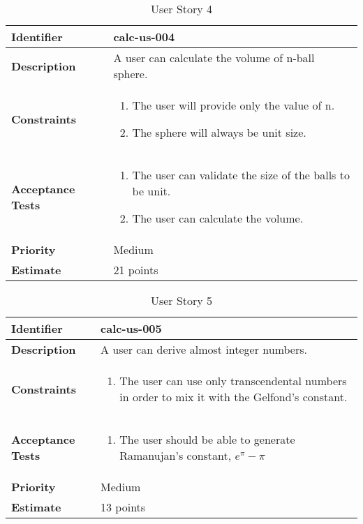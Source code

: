 \documentclass{article}
\begin{document}
\begin{table}[h]
\centering
\begin{tabular}{|p{2.2cm}|p{12cm}|}
\hline
\textbf{Identifier} & {calc-us-004} \\
\hline
\textbf{Description} & {A user can calculate the volume of n-ball sphere.}\\
\hline
\textbf{Constraints} & 
\begin{enumerate}
    \item The user will provide only the value of n.
    \item The sphere will always be unit size. 
\end{enumerate}\\
\hline
\textbf{Acceptance Tests} & 
\begin{enumerate}
    \item The user can validate the size of the balls to be unit.
    \item The user can calculate the volume.
\end{enumerate}\\
\hline
\textbf{Priority} & {Medium}\\
\hline
\textbf{Estimate} & {21 points}\\
\hline
\end{tabular}
\caption{User Story 4}
\end{table}

\begin{table}[h]
\centering
\begin{tabular}{|p{2.2cm}|p{12cm}|}
\hline
\textbf{Identifier} & {calc-us-005} \\
\hline
\textbf{Description} & {A user can derive almost integer numbers.}\\
\hline
\textbf{Constraints} & 
\begin{enumerate}
    \item The user can use only transcendental numbers in order to mix it with the Gelfond's constant.
\end{enumerate}\\
\hline
\textbf{Acceptance Tests} & 
\begin{enumerate}
    \item The user should be able to generate Ramanujan's constant, $e^{\pi} - \pi$
\end{enumerate}\\
\hline
\textbf{Priority} & {Medium}\\
\hline
\textbf{Estimate} & {13 points}\\
\hline
\end{tabular}
\caption{User Story 5}
\end{table}
\end{document}
